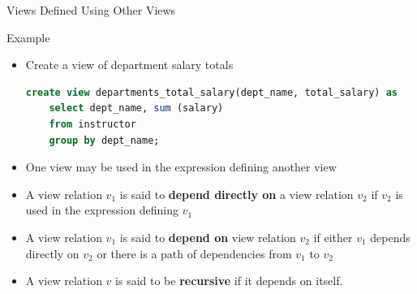 \documentclass[aspectratio=169, xcolor=dvipsnames]{beamer}
\begin{document}

\begin{frame}[fragile]{Views Defined Using Other Views}
    \begin{exampleblock}{Example}
        \begin{itemize}[<+->]
            \item Create a view of department salary totals
            \begin{lstlisting}[language=SQL]
create view departments_total_salary(dept_name, total_salary) as
    select dept_name, sum (salary) 
    from instructor 
    group by dept_name;
            \end{lstlisting}
            \item One view may be used in the expression defining another view
            \item A view relation $v_1$ is said to \textbf{depend directly on} a view relation $v_2$ if $v_2$ is used in the expression defining $v_1$
            \item A view relation $v_1$ is said to \textbf{depend on} view relation $v_2$ if either $v_1$ depends directly on $v_2$ or there is a path of dependencies from $v_1$ to $v_2$
            \item A view relation $v$ is said to be \textbf{recursive} if it depends on itself.
        \end{itemize}
    \end{exampleblock}
\end{frame}
\end{document}
